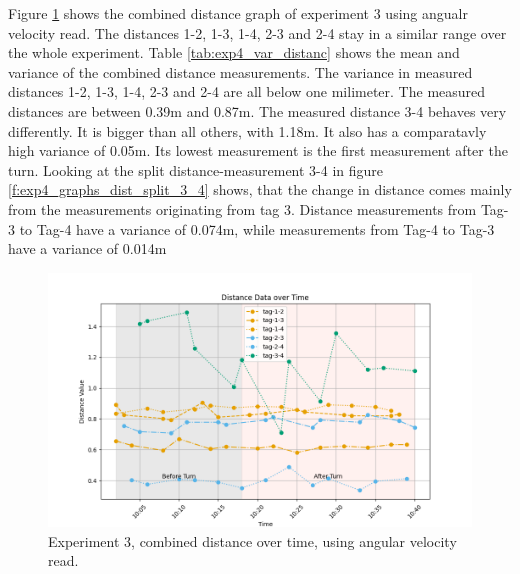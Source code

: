 Figure \ref{f:exp4_graphs_dist_comb_2} shows the combined distance graph of experiment 3 using angualr velocity read.
The distances 1-2, 1-3, 1-4, 2-3 and 2-4 stay in a similar range over the whole experiment.
Table \ref{tab:exp4_var_distanc} shows the mean and variance of the combined distance measurements.
The variance in measured distances 1-2, 1-3, 1-4, 2-3 and 2-4 are all below one milimeter.
The measured distances are between 0.39m and 0.87m.
The measured distance 3-4 behaves very differently.
It is bigger than all others, with 1.18m.
It also has a comparatavly high variance of 0.05m.
Its lowest measurement is the first measurement after the turn.
Looking at the split distance-measurement 3-4 in figure \ref{f:exp4_graphs_dist_split_3_4} shows, that the change in distance comes mainly from the measurements originating from tag 3.
Distance measurements from Tag-3 to Tag-4 have a variance of 0.074m, while measurements from Tag-4 to Tag-3 have a variance of 0.014m

\begin{figure}[ht!]
	\includegraphics[width=\linewidth]{graphics/exp/exp4_2_dist_combined_2.png}
	\caption{Experiment 3, combined distance over time, using angular velocity read.}
	\label{f:exp4_graphs_dist_comb_2}
\end{figure}

